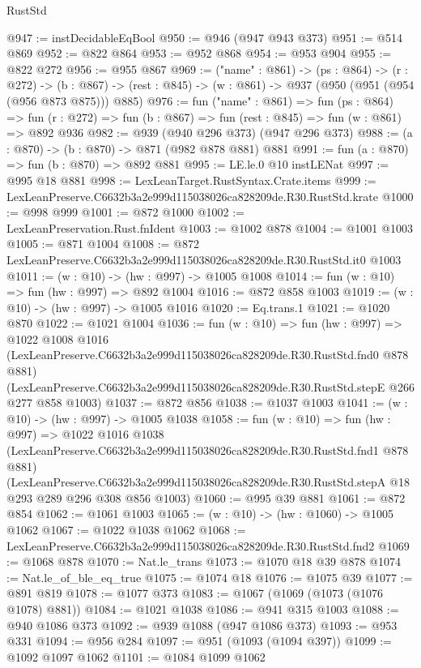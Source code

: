 \begin{lexlean}{RustStd}
\begin{coremodule}
@947 := instDecidableEqBool
@950 := @946 (@947 @943 @373)
@951 := @514 @869
@952 := @822 @864
@953 := @952 @868
@954 := @953 @904
@955 := @822 @272
@956 := @955 @867
@969 := ("name" : @861) ->
  (ps : @864) ->
  (r : @272) ->
  (b : @867) -> (rest : @845) -> (w : @861) -> @937 (@950 (@951 (@954 (@956 @873 @875))) @885)
@976 := fun ("name" : @861) =>
  fun (ps : @864) =>
  fun (r : @272) => fun (b : @867) => fun (rest : @845) => fun (w : @861) => @892 @936
@982 := @939 (@940 @296 @373) (@947 @296 @373)
@988 := (a : @870) -> (b : @870) -> @871 (@982 @878 @881) @881
@991 := fun (a : @870) => fun (b : @870) => @892 @881
@995 := LE.le.{0} @10 instLENat
@997 := @995 @18 @881
@998 := LexLeanTarget.RustSyntax.Crate.items
@999 := LexLeanPreserve.C6632b3a2e999d115038026ca828209de.R30.RustStd.krate
@1000 := @998 @999
@1001 := @872 @1000
@1002 := LexLeanPreservation.Rust.fnIdent
@1003 := @1002 @878
@1004 := @1001 @1003
@1005 := @871 @1004
@1008 := @872 LexLeanPreserve.C6632b3a2e999d115038026ca828209de.R30.RustStd.it0 @1003
@1011 := (w : @10) -> (hw : @997) -> @1005 @1008
@1014 := fun (w : @10) => fun (hw : @997) => @892 @1004
@1016 := @872 @858 @1003
@1019 := (w : @10) -> (hw : @997) -> @1005 @1016
@1020 := Eq.trans.{1}
@1021 := @1020 @870
@1022 := @1021 @1004
@1036 := fun (w : @10) =>
  fun (hw : @997) =>
  @1022
    @1008
    @1016
    (LexLeanPreserve.C6632b3a2e999d115038026ca828209de.R30.RustStd.fnd0 @878 @881)
    (LexLeanPreserve.C6632b3a2e999d115038026ca828209de.R30.RustStd.stepE @266 @277 @858 @1003)
@1037 := @872 @856
@1038 := @1037 @1003
@1041 := (w : @10) -> (hw : @997) -> @1005 @1038
@1058 := fun (w : @10) =>
  fun (hw : @997) =>
  @1022
    @1016
    @1038
    (LexLeanPreserve.C6632b3a2e999d115038026ca828209de.R30.RustStd.fnd1 @878 @881)
    (LexLeanPreserve.C6632b3a2e999d115038026ca828209de.R30.RustStd.stepA
      @18
      @293
      @289
      @296
      @308
      @856
      @1003)
@1060 := @995 @39 @881
@1061 := @872 @854
@1062 := @1061 @1003
@1065 := (w : @10) -> (hw : @1060) -> @1005 @1062
@1067 := @1022 @1038 @1062
@1068 := LexLeanPreserve.C6632b3a2e999d115038026ca828209de.R30.RustStd.fnd2
@1069 := @1068 @878
@1070 := Nat.le_trans
@1073 := @1070 @18 @39 @878
@1074 := Nat.le_of_ble_eq_true
@1075 := @1074 @18
@1076 := @1075 @39
@1077 := @891 @819
@1078 := @1077 @373
@1083 := @1067 (@1069 (@1073 (@1076 @1078) @881))
@1084 := @1021 @1038
@1086 := @941 @315 @1003
@1088 := @940 @1086 @373
@1092 := @939 @1088 (@947 @1086 @373)
@1093 := @953 @331
@1094 := @956 @284
@1097 := @951 (@1093 (@1094 @397))
@1099 := @1092 @1097 @1062
@1101 := @1084 @1099 @1062

\end{coremodule}
\end{lexlean}
